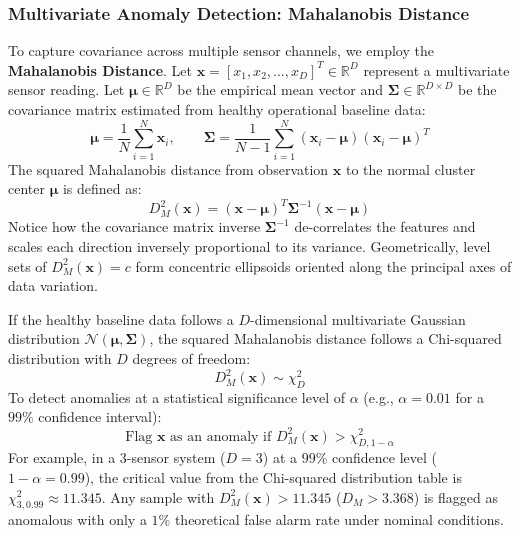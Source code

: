 \subsubsection{Multivariate Anomaly Detection: Mahalanobis Distance}

To capture covariance across multiple sensor channels, we employ the \textbf{Mahalanobis Distance}. Let $\mathbf{x} = [x_1, x_2, \dots, x_D]^T \in \mathbb{R}^D$ represent a multivariate sensor reading. Let $\boldsymbol{\mu} \in \mathbb{R}^D$ be the empirical mean vector and $\mathbf{\Sigma} \in \mathbb{R}^{D \times D}$ be the covariance matrix estimated from healthy operational baseline data:
\begin{equation}
\boldsymbol{\mu} = \frac{1}{N}\sum_{i=1}^N \mathbf{x}_i, \qquad \mathbf{\Sigma} = \frac{1}{N-1}\sum_{i=1}^N (\mathbf{x}_i - \boldsymbol{\mu})(\mathbf{x}_i - \boldsymbol{\mu})^T\label{eq:sample_mean_cov}
\end{equation}
The squared Mahalanobis distance from observation $\mathbf{x}$ to the normal cluster center $\boldsymbol{\mu}$ is defined as:
\begin{equation}
D_M^2(\mathbf{x}) = (\mathbf{x} - \boldsymbol{\mu})^T \mathbf{\Sigma}^{-1} (\mathbf{x} - \boldsymbol{\mu})\label{eq:mahalanobis_dist}
\end{equation}
Notice how the covariance matrix inverse $\mathbf{\Sigma}^{-1}$ de-correlates the features and scales each direction inversely proportional to its variance. Geometrically, level sets of $D_M^2(\mathbf{x}) = c$ form concentric ellipsoids oriented along the principal axes of data variation.

\begin{keyidea}
If the healthy baseline data follows a $D$-dimensional multivariate Gaussian distribution $\mathcal{N}(\boldsymbol{\mu}, \mathbf{\Sigma})$, the squared Mahalanobis distance follows a Chi-squared distribution with $D$ degrees of freedom:
\begin{equation}
D_M^2(\mathbf{x}) \sim \chi^2_D\label{eq:chi_sq_distribution}
\end{equation}
To detect anomalies at a statistical significance level of $\alpha$ (e.g., $\alpha = 0.01$ for a $99\%$ confidence interval):
\begin{equation}
\text{Flag } \mathbf{x} \text{ as an anomaly if } D_M^2(\mathbf{x}) > \chi^2_{D, 1-\alpha}\label{eq:mahalanobis_threshold}
\end{equation}
For example, in a 3-sensor system ($D = 3$) at a $99\%$ confidence level ($1 - \alpha = 0.99$), the critical value from the Chi-squared distribution table is $\chi^2_{3, 0.99} \approx 11.345$. Any sample with $D_M^2(\mathbf{x}) > 11.345$ ($D_M > 3.368$) is flagged as anomalous with only a $1\%$ theoretical false alarm rate under nominal conditions.
\end{keyidea}

